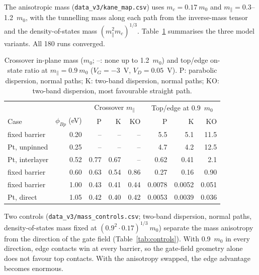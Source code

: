 \documentclass[11pt]{article}
\begin{document}
The anisotropic mass (\texttt{data\_v3/kane\_map.csv}) uses $m_c=0.17~m_0$ and $m_\parallel=0.3$--1.2~$m_0$, with the tunnelling mass along each path from the inverse-mass tensor and the density-of-states mass $(m_\parallel^2m_c)^{1/3}$. Table~\ref{tab:mass} summarises the three model variants. All 180 runs converged.

\begin{table}[!htbp]
\centering
\caption{Crossover in-plane mass ($m_0$; --: none up to 1.2~$m_0$) and top/edge on-state ratio at $m_\parallel=0.9~m_0$ ($V_G=-3$~V, $V_D=0.05$~V). P: parabolic dispersion, normal paths; K: two-band dispersion, normal paths; KO: two-band dispersion, most favourable straight path.}
\label{tab:mass}\small
\begin{tabular}{lrrrrrrr}
\toprule
 & & \multicolumn{3}{c}{Crossover $m_\parallel$} & \multicolumn{3}{c}{Top/edge at 0.9~$m_0$} \\
Case & $\phi_{Bp}$ (eV) & P & K & KO & P & K & KO \\
\midrule
fixed barrier & 0.20 & -- & -- & -- & 5.5 & 5.1 & 11.5 \\
Pt, unpinned & 0.25 & -- & -- & -- & 4.7 & 4.2 & 12.5 \\
Pt, interlayer & 0.52 & 0.77 & 0.67 & -- & 0.62 & 0.41 & 2.1 \\
fixed barrier & 0.60 & 0.63 & 0.54 & 0.86 & 0.27 & 0.16 & 0.90 \\
fixed barrier & 1.00 & 0.43 & 0.41 & 0.44 & 0.0078 & 0.0052 & 0.051 \\
Pt, direct & 1.05 & 0.42 & 0.40 & 0.42 & 0.0053 & 0.0039 & 0.036 \\
\bottomrule
\end{tabular}
\end{table}

Two controls (\texttt{data\_v3/mass\_controls.csv}; two-band dispersion, normal paths, density-of-states mass fixed at $(0.9^2\cdot0.17)^{1/3}~m_0$) separate the mass anisotropy from the direction of the gate field (Table~\ref{tab:controls}). With 0.9~$m_0$ in every direction, edge contacts win at every barrier, so the gate-field geometry alone does not favour top contacts. With the anisotropy swapped, the edge advantage becomes enormous.
\end{document}
